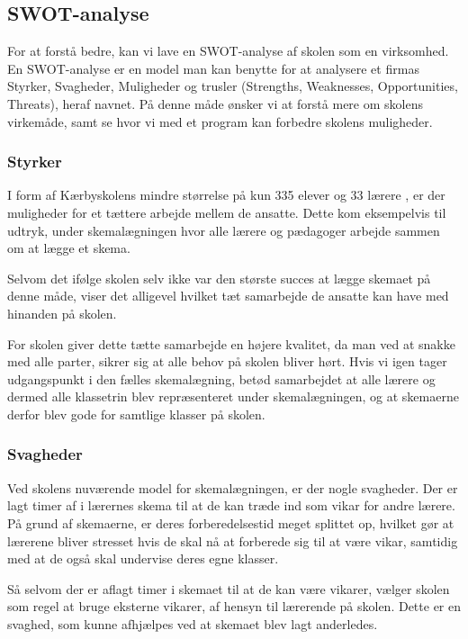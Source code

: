 \subsection{SWOT-analyse}
For at forstå \school bedre, kan vi lave en SWOT-analyse af skolen som en virksomhed. En SWOT-analyse er en model man kan benytte for at analysere et firmas Styrker, Svagheder, Muligheder og trusler (Strengths, Weaknesses, Opportunities, Threats), heraf navnet. På denne måde ønsker vi at forstå mere om skolens virkemåde, samt se hvor vi med et program kan forbedre skolens muligheder.

\subsubsection*{Styrker}
I form af Kærbyskolens mindre størrelse på kun 335 elever og 33 lærere \cite{Kaerbyskolens-laerere}, er der muligheder for et tættere arbejde mellem de ansatte. Dette kom eksempelvis til udtryk, under skemalægningen hvor alle lærere og pædagoger arbejde sammen om at lægge et skema.

Selvom det ifølge skolen selv ikke var den største succes at lægge skemaet på denne måde, viser det alligevel hvilket tæt samarbejde de ansatte kan have med hinanden på skolen.

For skolen giver dette tætte samarbejde en højere kvalitet, da man ved at snakke med alle parter, sikrer sig at alle behov på skolen bliver hørt. Hvis vi igen tager udgangspunkt i den fælles skemalægning, betød samarbejdet at alle lærere og dermed alle klassetrin blev repræsenteret under skemalægningen, og at skemaerne derfor blev gode for samtlige klasser på skolen. 

\subsubsection*{Svagheder}
Ved skolens nuværende model for skemalægningen, er der nogle svagheder. Der er lagt timer af i lærernes skema til at de kan træde ind som vikar for andre lærere. På grund af skemaerne, er deres forberedelsestid meget splittet op, hvilket gør at lærerene bliver stresset hvis de skal nå at forberede sig til at være vikar, samtidig med at de også skal undervise deres egne klasser.

Så selvom der er aflagt timer i skemaet til at de kan være vikarer, vælger skolen som regel at bruge eksterne vikarer, af hensyn til lærerende på skolen. Dette er en svaghed, som kunne afhjælpes ved at skemaet blev lagt anderledes.

